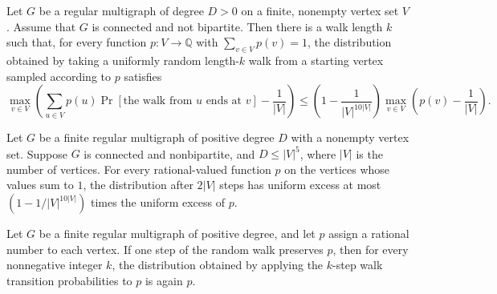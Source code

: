 \begin{theorem}
\label{Randomized.RegularMultigraph.exists_uniformExcess_walkDist_le}
\leanok
{}
Let $G$ be a regular multigraph of degree $D>0$ on a finite, nonempty vertex set $V$.
Assume that $G$ is connected and not bipartite. Then there is a walk length $k$ such
that, for every function $p:V\to\mathbb{Q}$ with $\sum_{v\in V}p(v)=1$, the distribution
obtained by taking a uniformly random length-$k$ walk from a starting vertex sampled
according to $p$ satisfies
\[\max_{v\in V}\left(\sum_{u\in V}p(u)\Pr[\text{the walk from }u\text{ ends at }v]-\frac{1}{|V|}\right)\leq \left(1-\frac{1}{|V|^{10|V|}}\right)\max_{v\in V}\left(p(v)-\frac{1}{|V|}\right).\]
\end{theorem}

\begin{theorem}
\label{Randomized.RegularMultigraph.uniformExcess_walkDist_two_mul_le}
\leanok
{}
Let $G$ be a finite regular multigraph of positive degree $D$ with a nonempty vertex
set. Suppose $G$ is connected and nonbipartite, and $D\le |V|^5$, where $|V|$ is the
number of vertices. For every rational-valued function $p$ on the vertices whose values
sum to $1$, the distribution after $2|V|$ steps has uniform excess at most
$\left(1-1/|V|^{10|V|}\right)$ times the uniform excess of $p$.
\end{theorem}

\begin{theorem}
\label{Randomized.RegularMultigraph.IsStationary.walkDist_eq}
\leanok
{}
Let $G$ be a finite regular multigraph of positive degree, and let $p$ assign a rational
number to each vertex. If one step of the random walk preserves $p$, then for every
nonnegative integer $k$, the distribution obtained by applying the $k$-step walk
transition probabilities to $p$ is again $p$.
\end{theorem}

